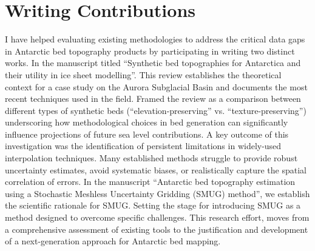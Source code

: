 \section{Writing Contributions}
I have helped evaluating existing methodologies to address the critical data gaps in Antarctic bed topography products by participating in writing two distinct works. In the manuscript titled ``Synthetic bed topographies for Antarctica and their utility in ice sheet modelling''. This review establishes the theoretical context for a case study on the Aurora Subglacial Basin and documents the most recent techniques used in the field. Framed the review as a comparison between different types of synthetic beds (``elevation-preserving'' vs. ``texture-preserving'') underscoring how methodological choices in bed generation can significantly influence projections of future sea level contributions. A key outcome of this investigation was the identification of persistent limitations in widely-used interpolation techniques. Many established methods struggle to provide robust uncertainty estimates, avoid systematic biases, or realistically capture the spatial correlation of errors.
In the manuscript ``Antarctic bed topography estimation using a Stochastic Meshless Uncertainty Gridding (SMUG) method'', we establish the scientific rationale for SMUG. Setting the stage for introducing SMUG as a method designed to overcome specific challenges. This research effort, moves from a comprehensive assessment of existing tools to the justification and development of a next-generation approach for Antarctic bed mapping.